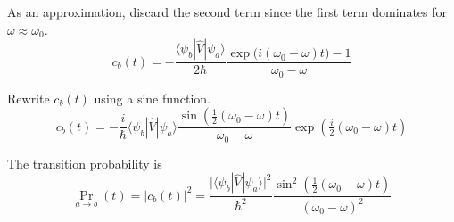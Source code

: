As an approximation, discard the second term since the first
term dominates for $\omega\approx\omega_0$.
\begin{equation*}
c_b(t)=-\frac{\langle\psi_b|\hat V|\psi_a\rangle}{2\hbar}
\frac{\exp\bigl(i(\omega_0-\omega)t\bigr)-1}{\omega_0-\omega}
\end{equation*}

Rewrite $c_b(t)$ using a sine function.
\begin{equation*}
c_b(t)=-\frac{i}{\hbar}\langle\psi_b|\hat V|\psi_a\rangle
\frac{\sin\left(\tfrac{1}{2}(\omega_0-\omega)t\right)}{\omega_0-\omega}
\exp\left(\tfrac{i}{2}(\omega_0-\omega)t\right)
\tag{3}
\end{equation*}

The transition probability is
\begin{equation*}
\Pr_{a\rightarrow b}(t)=|c_b(t)|^2
=\frac{\bigl|\langle\psi_b|\hat V|\psi_a\rangle\bigr|^2}{\hbar^2}
\frac{\sin^2\left(\tfrac{1}{2}(\omega_0-\omega)t\right)}
{(\omega_0-\omega)^2}
\tag{4}
\end{equation*}


